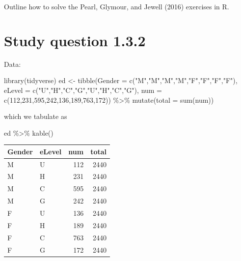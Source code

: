 \documentclass[
  letterpaper,
]{book}
\newenvironment{Shaded}{\begin{snugshade}}{\end{snugshade}}
\newcommand{\AttributeTok}[1]{\textcolor[rgb]{0.40,0.45,0.13}{#1}}
\newcommand{\DecValTok}[1]{\textcolor[rgb]{0.68,0.00,0.00}{#1}}
\newcommand{\FunctionTok}[1]{\textcolor[rgb]{0.28,0.35,0.67}{#1}}
\newcommand{\NormalTok}[1]{\textcolor[rgb]{0.00,0.23,0.31}{#1}}
\newcommand{\OtherTok}[1]{\textcolor[rgb]{0.00,0.23,0.31}{#1}}
\newcommand{\SpecialCharTok}[1]{\textcolor[rgb]{0.37,0.37,0.37}{#1}}
\newcommand{\StringTok}[1]{\textcolor[rgb]{0.13,0.47,0.30}{#1}}
\begin{document}
Outline how to solve the Pearl, Glymour, and Jewell (2016) exercises in
R.

\hypertarget{study-question-1.3.2}{%
\section{Study question 1.3.2}\label{study-question-1.3.2}}

Data:

\begin{Shaded}
\begin{Highlighting}[]
\FunctionTok{library}\NormalTok{(tidyverse)}
\NormalTok{ed }\OtherTok{\textless{}{-}} \FunctionTok{tibble}\NormalTok{(}\AttributeTok{Gender =} \FunctionTok{c}\NormalTok{(}\StringTok{"M"}\NormalTok{,}\StringTok{"M"}\NormalTok{,}\StringTok{"M"}\NormalTok{,}\StringTok{"M"}\NormalTok{,}\StringTok{"F"}\NormalTok{,}\StringTok{"F"}\NormalTok{,}\StringTok{"F"}\NormalTok{,}\StringTok{"F"}\NormalTok{),}
             \AttributeTok{eLevel =} \FunctionTok{c}\NormalTok{(}\StringTok{"U"}\NormalTok{,}\StringTok{"H"}\NormalTok{,}\StringTok{"C"}\NormalTok{,}\StringTok{"G"}\NormalTok{,}\StringTok{"U"}\NormalTok{,}\StringTok{"H"}\NormalTok{,}\StringTok{"C"}\NormalTok{,}\StringTok{"G"}\NormalTok{),}
             \AttributeTok{num    =} \FunctionTok{c}\NormalTok{(}\DecValTok{112}\NormalTok{,}\DecValTok{231}\NormalTok{,}\DecValTok{595}\NormalTok{,}\DecValTok{242}\NormalTok{,}\DecValTok{136}\NormalTok{,}\DecValTok{189}\NormalTok{,}\DecValTok{763}\NormalTok{,}\DecValTok{172}\NormalTok{)) }\SpecialCharTok{\%\textgreater{}\%}
  \FunctionTok{mutate}\NormalTok{(}\AttributeTok{total =} \FunctionTok{sum}\NormalTok{(num))}
\end{Highlighting}
\end{Shaded}

which we tabulate as

\begin{Shaded}
\begin{Highlighting}[]
\NormalTok{ed }\SpecialCharTok{\%\textgreater{}\%}
  \FunctionTok{kable}\NormalTok{()}
\end{Highlighting}
\end{Shaded}

\begin{longtable}[]{@{}llrr@{}}
\toprule()
Gender & eLevel & num & total \\
\midrule()
\endhead
M & U & 112 & 2440 \\
M & H & 231 & 2440 \\
M & C & 595 & 2440 \\
M & G & 242 & 2440 \\
F & U & 136 & 2440 \\
F & H & 189 & 2440 \\
F & C & 763 & 2440 \\
F & G & 172 & 2440 \\
\bottomrule()
\end{longtable}
\end{document}
